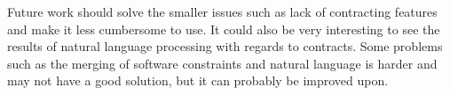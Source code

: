 Future work should solve the smaller issues such as lack of contracting features and make it less cumbersome to use.
It could also be very interesting to see the results of natural language processing with regards to contracts.
Some problems such as the merging of software constraints and natural language is harder and may not have a good solution, but it can probably be improved upon.




